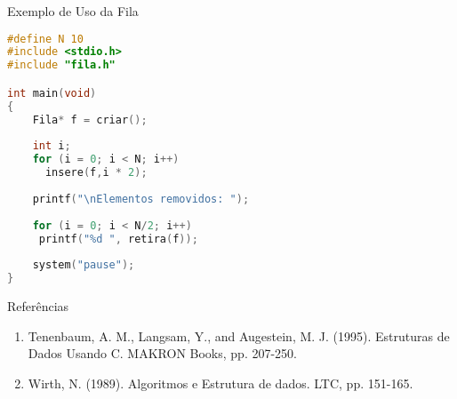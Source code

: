 \begin{frame}[fragile]{Exemplo de Uso da Fila}
\footnotesize
\begin{lstlisting}[language=C]
#define N 10
#include <stdio.h>
#include "fila.h"

int main(void)
{
    Fila* f = criar();
    
    int i;
    for (i = 0; i < N; i++)
      insere(f,i * 2);
      
    printf("\nElementos removidos: ");
      
    for (i = 0; i < N/2; i++)
     printf("%d ", retira(f)); 
               
    system("pause");    
}
\end{lstlisting}
\end{frame} 


\begin{frame}{Referências}
	\begin{enumerate}
		\item Tenenbaum, A. M., Langsam, Y., and Augestein, M. J. (1995). Estruturas de Dados Usando C. MAKRON Books, pp. 207-250.
		\item Wirth, N. (1989). Algoritmos e Estrutura de dados. LTC, pp. 151-165.
	\end{enumerate}
\end{frame}
